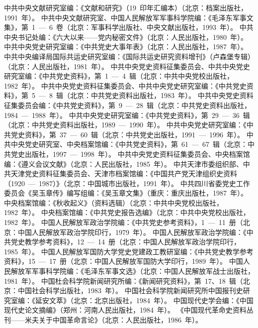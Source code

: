 \begin{thebibliography}{999}
\bibitem{}中共中央文献研究室编：《文献和研究》（19~印年汇编本）（北京：档案出版社，1991~年）。
\bibitem{}中共中央文献研究室、中国人民解放军军事科学院编：《毛泽东军事文集》，第~1~—~6~卷（北京：军事科学出版社、中央文献出版社，1993~年）。
\bibitem{}中共中央书记处编：《六大以来——党内秘密文件》（北京：人民出版社，1980~年）。
\bibitem{}中共中央党史研究室编：《中共党史大事年表》（北京：人民出版社，1987~年）。
\bibitem{}中共中央编译局国际共运史研究室编：《国际共运史研究资料增刊》（卢森堡专辑）（北京：人民出版社，1981~年）。
\bibitem{}中共中央党史资料征集委员会、中共中央党史研究室编：《中共党史资料》，第~1~—~4~辑（北京：中共中央党校出版社，1982~年）。
\bibitem{}中共中央党史资料征集委员会、中共中央党史研究室编：《中共党史资料》，第~5~—~8~辑（北京：中共党史资料出版社，1983~年）。
\bibitem{}中共中央党史资料征集委员会编：《中共党史资料》，第~9~—~28~辑（北京：中共党史资料出版社，1984~—~1988~年）。
\bibitem{}中共中央党史研究室编：《中共党史资料》，第~29~—~36~辑（北京：中共党史资料出版社，1989~—~1990~年）。
\bibitem{}中共中央党史研究室编：《中共党史资料》，第~37~—~60~辑（北京：中共党史出版社，1991~—~1996~年）。
\bibitem{}中共中央党史研究室、中央档案馆编：《中共党史资料》，第~61~—~67~辑（北京：中共党史出版社，1997~—~1998~年）。
\bibitem{}中共中央党史资料征集委员会、中央档案馆编：《遵义会议文献》（北京：人民出版社，1985~年）。
\bibitem{}中共天津市委组织部、中共天津党史资料征集委员会、天津市档案馆编：《中国共产党天津组织史资料（1920~—~1987）》（北京：中国城市出版社，1991~年）。
\bibitem{}中共四川省委党史工作委员会《吴玉章传》编写组编：《吴玉章文集》（重庆：重庆出版杜，1987~年）。
\bibitem{}中央档案馆编：《秋收起义》（资料选辑）（北京：中共中央党校出版社，1982~年）。
\bibitem{}中央档案馆编：《中共党史报告选编》（北京：中共中央党校出版社，1982~年）。
\bibitem{}中国人民解放军政治学院编：《中共党史参考资料》，1~—~11~册（北京：中国人民解放军政治学院印行，1979~年）。
\bibitem{}中国人民解放军政治学院编：《中共党史教学参考资料》，12~—~14~册（北京：中国人民解放军政治学院印行，1985~年）。
\bibitem{}中国人民解放军国防大学党史党建政工教研室编：《中共党史教学参考资料》，15~—~17~册（北京：中国人民解放军国防大学印行，1989~年）。
\bibitem{}中国人民解放军军事科学院编：《毛泽东军事文选》（北京：中国人民解放军战士出版社，1981~年）。
\bibitem{}中国杜会科学院新闻研究所编：《新闻研究资料》，第~17、18~辑（北京：中国社会科学出版社，1983~年）。
\bibitem{}中国社会科学院新闻研究所中国报刊史研究室编：《延安文萃》（北京：北京出版社，1984~年）。
\bibitem{}中国现代史学会编：《中国现代史论文摘编》（郑州：河南人民出版社，1984~年）。
\bibitem{}《中国现代革命史资料丛刊——米夫关于中国革命言论》（北京：人民出版社，1986~年）。

\end{thebibliography}
